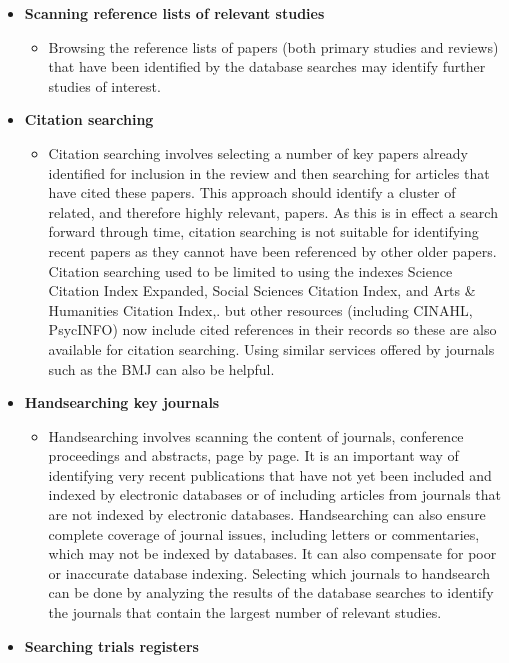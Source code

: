 \documentclass[
  10pt,
  a4paper,
  DIV=11,
  numbers=noendperiod]{scrreprt}
\providecommand{\tightlist}{%
  \setlength{\itemsep}{0pt}\setlength{\parskip}{0pt}}
\begin{document}
\begin{itemize}
\item
  \textbf{Scanning reference lists of relevant studies}

  \begin{itemize}
  \tightlist
  \item
    Browsing the reference lists of papers (both primary studies and
    reviews) that have been identified by the database searches may
    identify further studies of interest.
  \end{itemize}
\item
  \textbf{Citation searching}

  \begin{itemize}
  \tightlist
  \item
    Citation searching involves selecting a number of key papers already
    identified for inclusion in the review and then searching for
    articles that have cited these papers. This approach should identify
    a cluster of related, and therefore highly relevant, papers. As this
    is in effect a search forward through time, citation searching is
    not suitable for identifying recent papers as they cannot have been
    referenced by other older papers. Citation searching used to be
    limited to using the indexes Science Citation Index Expanded, Social
    Sciences Citation Index, and Arts \& Humanities Citation Index,. but
    other resources (including CINAHL, PsycINFO) now include cited
    references in their records so these are also available for citation
    searching. Using similar services offered by journals such as the
    BMJ can also be helpful.
  \end{itemize}
\item
  \textbf{Handsearching key journals}

  \begin{itemize}
  \tightlist
  \item
    Handsearching involves scanning the content of journals, conference
    proceedings and abstracts, page by page. It is an important way of
    identifying very recent publications that have not yet been included
    and indexed by electronic databases or of including articles from
    journals that are not indexed by electronic databases. Handsearching
    can also ensure complete coverage of journal issues, including
    letters or commentaries, which may not be indexed by databases. It
    can also compensate for poor or inaccurate database indexing.
    Selecting which journals to handsearch can be done by analyzing the
    results of the database searches to identify the journals that
    contain the largest number of relevant studies.
  \end{itemize}
\item
  \textbf{Searching trials registers}


\end{itemize}
\end{document}
